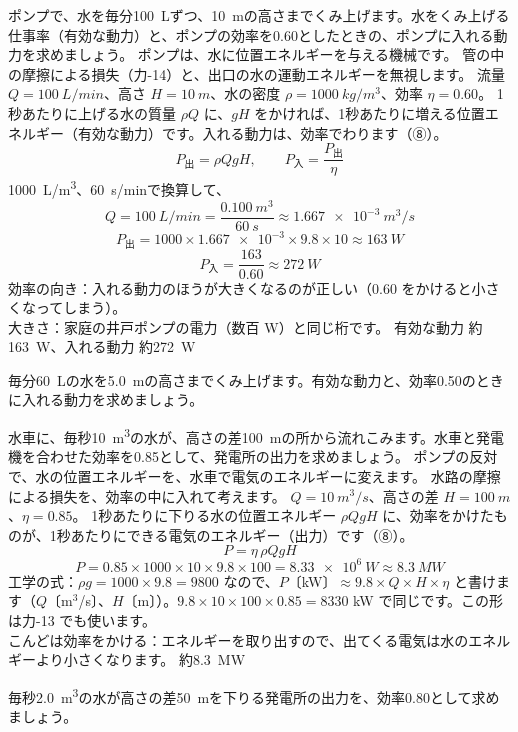 \label{ph:力-4:ex9}
\begin{phreidai}[ポンプで水をくみ上げる]
ポンプで、水を毎分\qty{100}{L}ずつ、\qty{10}{m}の高さまでくみ上げます。水をくみ上げる仕事率（有効な動力）と、ポンプの効率を0.60としたときの、ポンプに入れる動力を求めましょう。
\phbamen
ポンプは、水に位置エネルギーを与える機械です。
\phmushi
管の中の摩擦による損失（力-14）と、出口の水の運動エネルギーを無視します。
\phzu
流量 $Q=\qty{100}{L/min}$、高さ $H=\qty{10}{m}$、水の密度 $\rho=\qty{1000}{kg/m^3}$、効率 $\eta=0.60$。
\phriyu
1秒あたりに上げる水の質量 $\rho Q$ に、$gH$ をかければ、1秒あたりに増える位置エネルギー（有効な動力）です。入れる動力は、効率でわります（⑧）。
\phtateru
\[P_{\text{出}}=\rho QgH,\qquad P_{\text{入}}=\frac{P_{\text{出}}}{\eta}\]
\phtoku
\qty{1000}{L/m^3}、\qty{60}{s/min}で換算して、
\[Q=\qty{100}{L/min}=\frac{\qty{0.100}{m^3}}{\qty{60}{s}}\approx\qty{1.667e-3}{m^3/s}\]
\[P_{\text{出}}=1000\times\num{1.667e-3}\times9.8\times10\approx\qty{163}{W}\]
\[P_{\text{入}}=\frac{163}{0.60}\approx\qty{272}{W}\]
\phtashikame
効率の向き：入れる動力のほうが大きくなるのが正しい（$0.60$ をかけると小さくなってしまう）。\\
大きさ：家庭の井戸ポンプの電力（数百 W）と同じ桁です。
\kotae 有効な動力 約\qty{163}{W}、入れる動力 約\qty{272}{W}
\end{phreidai}
\begin{jibun}
毎分\qty{60}{L}の水を\qty{5.0}{m}の高さまでくみ上げます。有効な動力と、効率0.50のときに入れる動力を求めましょう。
\end{jibun}

\label{ph:力-4:ex10}
\begin{phreidai}[水力発電所の出力]
水車に、毎秒\qty{10}{m^3}の水が、高さの差\qty{100}{m}の所から流れこみます。水車と発電機を合わせた効率を0.85として、発電所の出力を求めましょう。
\phbamen
ポンプの反対で、水の位置エネルギーを、水車で電気のエネルギーに変えます。
\phmushi
水路の摩擦による損失を、効率の中に入れて考えます。
\phzu
$Q=\qty{10}{m^3/s}$、高さの差 $H=\qty{100}{m}$、$\eta=0.85$。
\phriyu
1秒あたりに下りる水の位置エネルギー $\rho QgH$ に、効率をかけたものが、1秒あたりにできる電気のエネルギー（出力）です（⑧）。
\phtateru
\[P=\eta\,\rho QgH\]
\phtoku
\[P=0.85\times1000\times10\times9.8\times100=\qty{8.33e6}{W}\approx\qty{8.3}{MW}\]
\phtashikame
工学の式：$\rho g=1000\times9.8=9800$ なので、$P$〔kW〕$\approx9.8\times Q\times H\times\eta$ と書けます（$Q$〔m$^3$/s〕、$H$〔m〕）。$9.8\times10\times100\times0.85=\num{8330}$ kW で同じです。この形は力-13 でも使います。\\
こんどは効率をかける：エネルギーを取り出すので、出てくる電気は水のエネルギーより小さくなります。
\kotae 約\qty{8.3}{MW}
\end{phreidai}
\begin{jibun}
毎秒\qty{2.0}{m^3}の水が高さの差\qty{50}{m}を下りる発電所の出力を、効率0.80として求めましょう。
\end{jibun}


